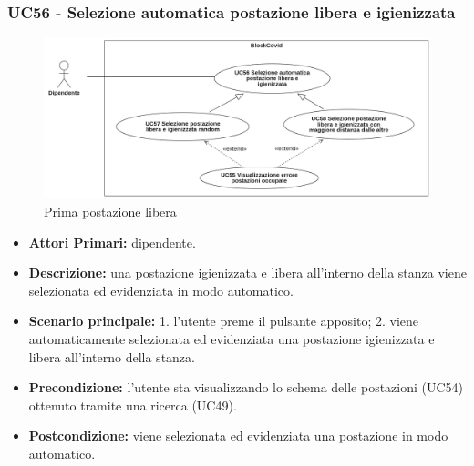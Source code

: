 \subsubsection{ UC56 - Selezione automatica postazione libera e igienizzata}
\begin{figure}[H]
	\centering
	\includegraphics[width=18cm]{res/images/UC55-56-57-58.png}
	\caption{Prima postazione libera}
	\label{fig:Prima postazione libera}
\end{figure}
\begin{itemize}
	\item\textbf{Attori Primari:} dipendente.
	\item\textbf{Descrizione:} una postazione igienizzata e libera all'interno della stanza viene selezionata ed evidenziata	in modo automatico.
	\item\textbf{Scenario principale:}
	1. l'utente preme il pulsante apposito;
	2. viene automaticamente selezionata ed evidenziata una postazione igienizzata e libera all'interno della stanza.
	\item\textbf{Precondizione:} l’utente sta visualizzando lo schema delle postazioni (UC54) ottenuto tramite una ricerca (UC49).
	\item\textbf{Postcondizione:} viene selezionata ed evidenziata una postazione in modo automatico.
\end{itemize}
